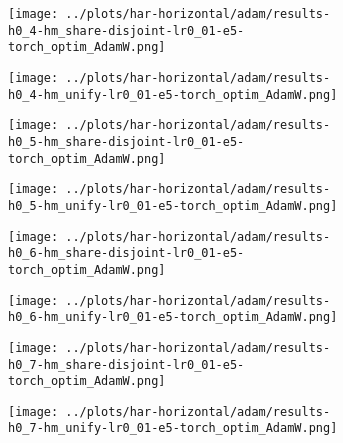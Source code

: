 \begin{figure}[htbp]  %
    \centering
    \begin{subfigure}[b]{0.47\textwidth}
        \centering
        \texttt{[image: ../plots/har-horizontal/adam/results-h0\_4-hm\_share-disjoint-lr0\_01-e5-torch\_optim\_AdamW.png]}
    \end{subfigure}
    \hfill
    \begin{subfigure}[b]{0.47\textwidth}
        \centering
        \texttt{[image: ../plots/har-horizontal/adam/results-h0\_4-hm\_unify-lr0\_01-e5-torch\_optim\_AdamW.png]}
    \end{subfigure}
\end{figure}
\begin{figure}[htbp]  %
    \centering
    \begin{subfigure}[b]{0.47\textwidth}
        \centering
        \texttt{[image: ../plots/har-horizontal/adam/results-h0\_5-hm\_share-disjoint-lr0\_01-e5-torch\_optim\_AdamW.png]}
    \end{subfigure}
    \hfill
    \begin{subfigure}[b]{0.47\textwidth}
        \centering
        \texttt{[image: ../plots/har-horizontal/adam/results-h0\_5-hm\_unify-lr0\_01-e5-torch\_optim\_AdamW.png]}
    \end{subfigure}
\end{figure}
\begin{figure}[htbp]  %
    \centering
    \begin{subfigure}[b]{0.47\textwidth}
        \centering
        \texttt{[image: ../plots/har-horizontal/adam/results-h0\_6-hm\_share-disjoint-lr0\_01-e5-torch\_optim\_AdamW.png]}
    \end{subfigure}
    \hfill
    \begin{subfigure}[b]{0.47\textwidth}
        \centering
        \texttt{[image: ../plots/har-horizontal/adam/results-h0\_6-hm\_unify-lr0\_01-e5-torch\_optim\_AdamW.png]}
    \end{subfigure}
\end{figure}
\begin{figure}[htbp]  %
    \centering
    \begin{subfigure}[b]{0.47\textwidth}
        \centering
        \texttt{[image: ../plots/har-horizontal/adam/results-h0\_7-hm\_share-disjoint-lr0\_01-e5-torch\_optim\_AdamW.png]}
    \end{subfigure}
    \hfill
    \begin{subfigure}[b]{0.47\textwidth}
        \centering
        \texttt{[image: ../plots/har-horizontal/adam/results-h0\_7-hm\_unify-lr0\_01-e5-torch\_optim\_AdamW.png]}
    \end{subfigure}
\end{figure}
